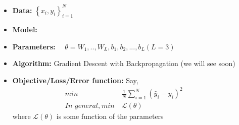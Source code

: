 \begin{frame}
  \begin{columns}
    \begin{overlayarea}{\textwidth}{\textheight}
      \makebox[\textwidth][c]{\usebox{\nncontent}}
    \end{overlayarea}

      \begin{itemize}
        \justifying
        \item <1-> \textbf{Data:} $\left\{ x_{i},y_{i} \right\}_{i=1}^{N}$
        \item <2-> \textbf{Model:} 
        \item <4-> \textbf{Parameters:} $\quad \theta = {W_{1}, .., W_{L}, b_1, b_2, ... , b_L} (L =3)$
        \item <5-> \textbf{Algorithm:} Gradient Descent with Backpropagation (we will see soon)
        \item <6-> \textbf{Objective/Loss/Error function:} Say,
            \vspace{-0.2in}
            \begin{align*}
              min                        & ~ \frac{1}{N} \sum_{i=1}^{N} (\hat y_{i} - y_{i})^{2} \\
              \textit{In general,} ~ min & ~ \mathscr{L}(\theta)
            \end{align*}
            where $\mathscr{L}(\theta)$ is some function of the parameters
      \end{itemize}
  \end{columns}
\end{frame}
